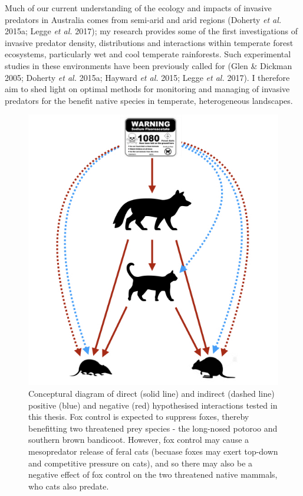 \documentclass[11pt,a4paper,titlepage,twoside,openright]{style/unimelbthesis}
\begin{document}
\begin{mainmatter}
Much of our current understanding of the ecology and impacts of invasive predators in Australia comes from semi-arid and arid regions (Doherty \emph{et al.} 2015a; Legge \emph{et al.} 2017); my research provides some of the first investigations of invasive predator density, distributions and interactions within temperate forest ecosystems, particularly wet and cool temperate rainforests. Such experimental studies in these environments have been previously called for (Glen \& Dickman 2005; Doherty \emph{et al.} 2015a; Hayward \emph{et al.} 2015; Legge \emph{et al.} 2017). I therefore aim to shed light on optimal methods for monitoring and managing of invasive predators for the benefit native species in temperate, heterogeneous landscapes.

\newpage
\begin{figure}

{\centering \includegraphics[width=0.85\linewidth]{figure/conceptual_diagram} 

}

\caption{Conceptural diagram of direct (solid line) and indirect (dashed line) positive (blue) and negative (red) hypothesised interactions tested in this thesis. Fox control is expected to suppress foxes, thereby benefitting two threatened prey species - the long-nosed potoroo and southern brown bandicoot. However, fox control may cause a mesopredator release of feral cats (becuase foxes may exert top-down and competitive pressure on cats), and so there may also be a negative effect of fox control on the two threatened native mammals, who cats also predate.}\label{fig:intro-diagram}
\end{figure}
\newpage


\end{mainmatter}
\end{document}
